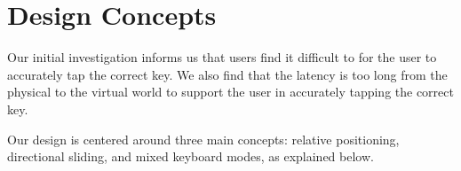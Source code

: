 \section{Design Concepts}

Our initial investigation informs us that users find it difficult to for the user to accurately tap the correct key.
We also find that the latency is too long from the physical to the virtual world to support the user in accurately tapping the correct key.


Our design is centered around three main concepts: relative positioning, directional sliding, and mixed keyboard modes, as explained below. 

